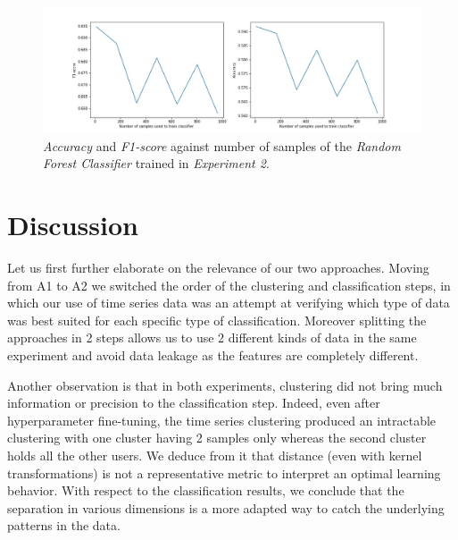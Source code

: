 \documentclass[sigplan,screen]{acmart}
\begin{document}
  \begin{figure}[h]
     \centering
     \includegraphics[width=\linewidth]{reports/figures/results_rf_2.jpg}
     \caption{\emph{Accuracy} and \emph{F1-score} against number of samples of the \emph{Random Forest Classifier} trained in \emph{Experiment 2}.}
     \label{fig:results_rf_2}
 \end{figure}

\section{Discussion}\label{sec:discussion}


Let us first further elaborate on the relevance of our two approaches. Moving from A1 to A2 we switched the order of the clustering and classification steps, in which our use of time series data was an attempt at verifying which type of data was best suited for each specific type of classification. Moreover splitting the approaches in 2 steps allows us to use 2 different kinds of data in the same experiment and avoid data leakage as the features are completely different.

Another observation is that in both experiments, clustering did not bring much information or precision to the classification step. Indeed, even after hyperparameter fine-tuning, the time series clustering produced an intractable clustering with one cluster having 2 samples only whereas the second cluster holds all the other users. We deduce from it that distance (even with kernel transformations) is not a representative metric to interpret an optimal learning behavior. With respect to the classification results, we conclude that the separation in various dimensions is a more adapted way to catch the underlying patterns in the data.
\end{document}
